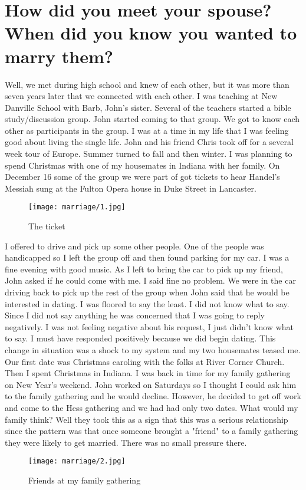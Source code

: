 \section{How did you meet your spouse? When did you know you wanted to marry them?}
Well, we met during high school and knew of each other, but it was more than seven years later that we connected with each other.
I was teaching at New Danville School with Barb, John's sister.
Several of the teachers started a bible study/discussion group.
John started coming to that group.
We got to know each other as participants in the group.
I was at a time in my life that I was feeling good about living the single life.
John and his friend Chris took off for a several week tour of Europe.
Summer turned to fall and then winter.
I was planning to spend Christmas with one of my housemates in Indiana with her family.
On December 16 some of the group we were part of got tickets to hear Handel's Messiah sung at the Fulton Opera house in Duke Street in Lancaster.
\begin{figure}
\centering
\texttt{[image: marriage/1.jpg]}
\caption{
The ticket
}
\end{figure}

I offered to drive and pick up some other people.
One of the people was handicapped so I left the group off and then found parking for my car.
I was a fine evening with good music.
As I left to bring the car to pick up my friend, John asked if he could come with me.
I said fine no problem.
We were in the car driving back to pick up the rest of the group when John said that he would be interested in dating.
I was floored to say the least.
I did not know what to say.
Since I did not say anything he was concerned that I was going to reply negatively.
I was not feeling negative about his request, I just didn't know what to say.
I must have responded positively because we did begin dating.
This change in situation was a shock to my system and my two housemates teased me.
Our first date was Christmas caroling with the folks at River Corner Church.
Then I spent Christmas in Indiana.
I was back in time for my family gathering on New Year's weekend.
John worked on Saturdays so I thought I could ask him to the family gathering and he would decline.
However, he decided to get off work and come to the Hess gathering and we had had only two dates.
What would my family think?
Well they took this as a sign that this was a serious relationship since the pattern was that once someone brought a "friend" to a family gathering they were likely to get married.
There was no small pressure there.
\begin{figure}
\centering
\texttt{[image: marriage/2.jpg]}
\caption{
Friends at my family gathering
}
\end{figure}

